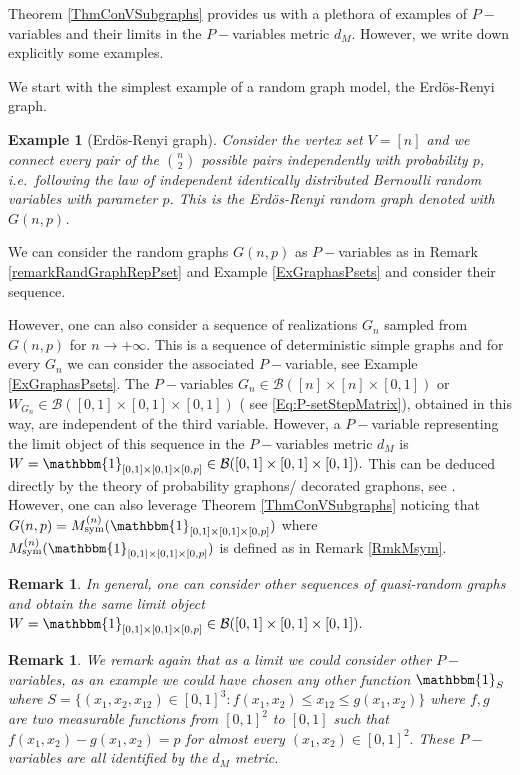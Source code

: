 \documentclass[11pt]{article}
\newtheorem{example}[theorem]{Example}
\newtheorem{remark}[theorem]{Remark}
\newcommand{\cB}{{\mathcal B}}  %
\begin{document}
Theorem \ref{ThmConVSubgraphs} provides us with a plethora of examples of $P-$variables and their limits in the $P-$variables metric $d_M.$  However, we write down explicitly some examples. 

We start with the simplest example of a random graph model, the Erd\"os-Renyi graph.
\begin{example}[Erd\"os-Renyi graph]\label{ERgraph}
Consider the vertex set $V=[n]$ and we connect every pair of the ${n \choose 2}$ possible pairs independently with probability $p$, i.e.\ following the law of independent identically distributed Bernoulli random variables with parameter $p$. This is the \emph{Erd\"os-Renyi random graph} denoted with $G(n,p)$.
\end{example}

We can consider the random graphs $G(n,p)$ as $P-$variables as in Remark \ref{remarkRandGraphRepPset} and Example \ref{ExGraphasPsets} and consider their sequence.

However, one can also consider a sequence of realizations $G_n$ sampled from $G(n,p)$ for $n\rightarrow+\infty.$ This is a sequence of deterministic simple graphs and for every $G_n$ we can consider the associated $P-$variable, see Example \ref{ExGraphasPsets}.  The $P-$variables $G_n\in \cB([n]\times [n]\times [0,1])$ or $W_{G_n}\in \cB([0,1]\times [0,1]\times [0,1])$ ( see \ref{Eq:P-setStepMatrix}), obtained in this way, are independent of the third variable. However, a $P-$variable representing the limit object of this sequence in the $P-$variables metric $d_M$ is $W=\mathbbm{1}_{[0,1]\times [0,1]\times [0,p]}\in \cB([0,1]\times [0,1]\times [0,1]).$ This can be deduced directly by the theory of probability graphons/ decorated graphons, see \cite{lovász2010limits, abraham2023probabilitygraphons,KUNSZENTIKOVACS2022109284}. However, one can also leverage Theorem \ref{ThmConVSubgraphs} noticing that $G(n,p)=M_{\text{sym}}^{(n)}(\mathbbm{1}_{[0,1]\times [0,1]\times [0,p]})$ where $M_{\text{sym}}^{(n)}(\mathbbm{1}_{[0,1]\times [0,1]\times [0,p]})$ is defined as in Remark \ref{RmkMsym}.


\begin{remark}
In general, one can consider other sequences of quasi-random graphs and obtain the same limit object $W=\mathbbm{1}_{[0,1]\times [0,1]\times [0,p]}\in \cB([0,1]\times [0,1]\times [0,1]).$
\end{remark}

\begin{remark}
We remark again that as a limit we could consider other $P-$variables, as an example we could have chosen any other function $\mathbbm{1}_{S}$ where $S=\{(x_1,x_2,x_{12})\in [0,1]^3: f(x_1,x_2)\leq x_{12}\leq g(x_1,x_2)\}$ where $f,g$ are two measurable functions from $[0,1]^2$ to $[0,1]$ such that $f(x_1,x_2)-g(x_1,x_2)=p$ for almost every $(x_1,x_2)\in [0,1]^2.$ These $P-$variables are all identified by the $d_M$ metric.
\end{remark}
\end{document}
